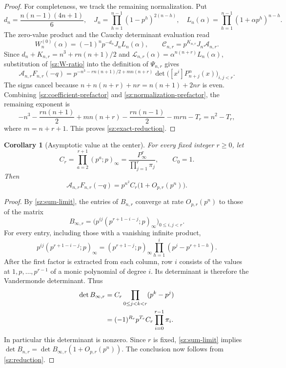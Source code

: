 \documentclass[11pt]{article}
\numberwithin{equation}{section}
\newtheorem{corollary}[corollary]{Corollary}
\theoremstyle{definition}
\theoremstyle{remark}
\begin{document}
\begin{proof}
For completeness, we track the remaining normalization.  Put
\[
 d_n=\frac{n(n-1)(4n+1)}6,\quad
 J_n=\prod_{h=1}^{n-1}(1-p^h)^{2(n-h)},\quad
 L_n(\alpha)=\prod_{h=1}^{n-1}(1+\alpha p^h)^{n-h}.
\]
The zero-value product and the Cauchy determinant evaluation read
\[
 W_n^{(0)}(\alpha)=(-1)^np^{-d_n}J_nL_n(\alpha),
 \qquad
 \mathcal C_{n,r}=p^{K_{n,r}}J_n\mathcal A_{n,r}.
\]
Since $d_n+K_{n,r}=n^3+rn(n+1)/2$ and
$\mathcal L_{n,r}(\alpha)=\alpha^{n(n+r)}L_n(\alpha)$,
substitution of \eqref{sz:W-ratio} into the definition of $\Psi_{n,r}$
gives
\begin{equation}\label{sz:normalization-prefactor}
 \mathcal A_{n,r}F_{n,r}(-q)
 =p^{-n^3-rn(n+1)/2+mn(n+r)}
 \det\bigl([x^i]P_{n+j}^\alpha(x)\bigr)_{i,j<r}.
\end{equation}
The signs cancel because
$n+n(n+r)+nr=n(n+1)+2nr$ is even.
Combining \eqref{sz:coefficient-prefactor} and
\eqref{sz:normalization-prefactor}, the remaining exponent is
\[
 -n^3-\frac{rn(n+1)}2+mn(n+r)
 -\frac{rn(n-1)}2-mrn-T_r=n^2-T_r,
\]
where $m=n+r+1$.  This proves \eqref{sz:exact-reduction}.
\end{proof}

\begin{corollary}[Asymptotic value at the center]\label{sz:center-value}
For every fixed integer $r\ge0$, let
\begin{equation}\label{sz:def-center-constant}
 C_r=\prod_{a=2}^{r+1}(p^a;p)_\infty
 =\frac{P_\infty^r}{\prod_{j=1}^{r}\pi_j},\qquad C_0=1.
\end{equation}
Then
\begin{equation}\label{sz:center-asymptotic}
 \mathcal A_{n,r}F_{n,r}(-q)
 =p^{n^2}C_r\bigl(1+O_{p,r}(p^n)\bigr).
\end{equation}
\end{corollary}

\begin{proof}
By \cref{sz:sum-limit}, the entries of $B_{n,r}$ converge at rate
$O_{p,r}(p^n)$ to those of the matrix
\[
 B_{\infty,r}
 =\bigl(p^{ij}(p^{r+1-i-j};p)_\infty\bigr)_{0\le i,j<r}.
\]
For every entry, including those with a vanishing infinite product,
\begin{equation}\label{sz:newton-factorization}
 p^{ij}(p^{r+1-i-j};p)_\infty
 =(p^{r+1-j};p)_\infty
 \prod_{h=1}^{i}(p^j-p^{r+1-h}).
\end{equation}
After the first factor is extracted from each column, row $i$ consists
of the values at $1,p,\ldots,p^{r-1}$ of a monic polynomial of degree
$i$.  Its determinant is therefore the Vandermonde determinant.  Thus
\begin{align}
 \det B_{\infty,r}
 &=C_r\prod_{0\le j<k<r}(p^k-p^j)\notag\\
 &=(-1)^{R_r}p^{T_r}
 C_r\prod_{i=0}^{r-1}\pi_i.\label{sz:limit-determinant}
\end{align}
In particular this determinant is nonzero.  Since $r$ is fixed,
\eqref{sz:sum-limit} implies
$\det B_{n,r}=\det B_{\infty,r}(1+O_{p,r}(p^n))$.
The conclusion now follows from \cref{sz:reduction}.
\end{proof}
\end{document}
